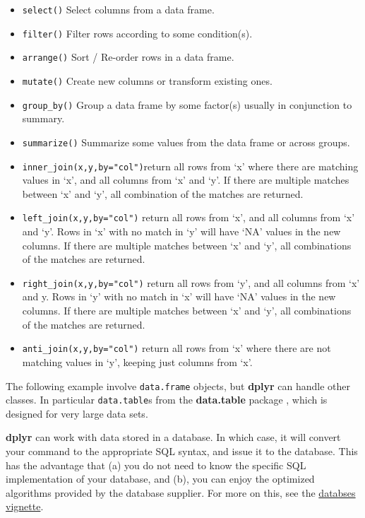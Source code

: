 \documentclass[]{book}
\providecommand{\tightlist}{%
  \setlength{\itemsep}{0pt}\setlength{\parskip}{0pt}}
\theoremstyle{definition}
\theoremstyle{definition}
\theoremstyle{definition}
\theoremstyle{remark}
\begin{document}
\begin{itemize}
\tightlist
\item
  \texttt{select()} Select columns from a data frame.
\item
  \texttt{filter()} Filter rows according to some condition(s).
\item
  \texttt{arrange()} Sort / Re-order rows in a data frame.
\item
  \texttt{mutate()} Create new columns or transform existing ones.
\item
  \texttt{group\_by()} Group a data frame by some factor(s) usually in
  conjunction to summary.
\item
  \texttt{summarize()} Summarize some values from the data frame or
  across groups.
\item
  \texttt{inner\_join(x,y,by="col")}return all rows from `x' where there
  are matching values in `x', and all columns from `x' and `y'. If there
  are multiple matches between `x' and `y', all combination of the
  matches are returned.
\item
  \texttt{left\_join(x,y,by="col")} return all rows from `x', and all
  columns from `x' and `y'. Rows in `x' with no match in `y' will have
  `NA' values in the new columns. If there are multiple matches between
  `x' and `y', all combinations of the matches are returned.
\item
  \texttt{right\_join(x,y,by="col")} return all rows from `y', and all
  columns from `x' and y. Rows in `y' with no match in `x' will have
  `NA' values in the new columns. If there are multiple matches between
  `x' and `y', all combinations of the matches are returned.
\item
  \texttt{anti\_join(x,y,by="col")} return all rows from `x' where there
  are not matching values in `y', keeping just columns from `x'.
\end{itemize}

The following example involve \texttt{data.frame} objects, but
\textbf{dplyr} can handle other classes. In particular
\texttt{data.table}s from the \textbf{data.table} package
\citep{datatable}, which is designed for very large data sets.

\textbf{dplyr} can work with data stored in a database. In which case,
it will convert your command to the appropriate SQL syntax, and issue it
to the database. This has the advantage that (a) you do not need to know
the specific SQL implementation of your database, and (b), you can enjoy
the optimized algorithms provided by the database supplier. For more on
this, see the
\href{https://cran.r-project.org/web/packages/dplyr/vignettes/databases.html}{databses
vignette}.
\end{document}
